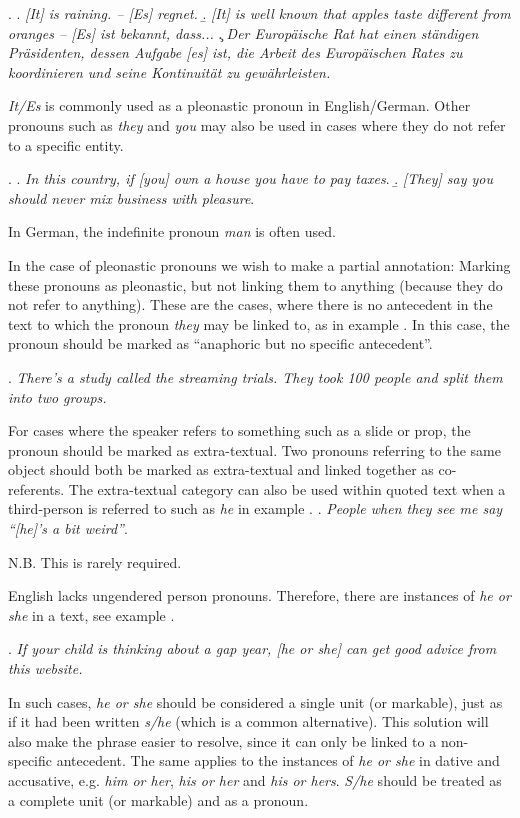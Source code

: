 \documentclass[a4paper]{article}
\begin{document}
\ex.
\a. {\sl [It] is raining. -- [Es] regnet.}
\b. {\sl [It] is well known that apples taste different from oranges --  [Es] ist bekannt, dass...}
\c. {\sl Der Europäische Rat hat einen ständigen Präsidenten, dessen Aufgabe [es] ist, die Arbeit des Europäischen Rates zu koordinieren und seine Kontinuität zu gewährleisten.}

{\sl It/Es} is commonly used as a pleonastic pronoun in English/German. Other pronouns such as {\sl they} and {\sl you} may also be used in cases where they do not refer to a specific
entity.

\ex.
\a. {\sl In this country, if [you] own a house you have to pay taxes}.
\b. {\sl [They] say you should never mix business with pleasure}.

In German, the indefinite pronoun {\sl man} is often used. 

In the case of pleonastic pronouns we wish to make a partial annotation: Marking these pronouns as pleonastic, but not linking them to anything (because they do not refer to anything). These are the cases, where there is no antecedent in the text to which the pronoun {\sl they} may be linked to, as in example \Next. In this case, the pronoun should be marked as ``anaphoric but no specific antecedent''.

\ex. {\sl There's a study called the streaming trials. {\sl They} took 100 people and split them into two groups.}

For cases where the speaker refers to something such as a slide or prop, the pronoun should be marked as extra-textual. Two pronouns referring to the same object should both be marked as extra-textual and linked together as co-referents.
The extra-textual category can also be used within quoted text when a third-person is referred to such as {\sl he} in example \Next.
\ex.
{\sl People when they see me say ``[he]'s a bit weird''}.

N.B. This is rarely required.


English lacks ungendered person pronouns. Therefore, there are instances of {\sl he or she} in a text, see example \Next.

\ex.
{\sl If your child is thinking about a gap year, [he or she] can get good advice from this website.}

In such cases, {\sl he or she} should be considered a single unit (or markable), just as if it had been written {\sl s/he} (which is a common alternative). This solution will also make the phrase easier to resolve, since it can only be linked to a
non-specific antecedent. The same applies to the instances of {\sl he or she} in dative and accusative, e.g. {\sl him or her}, {\sl his or her} and {\sl his or hers}. {\sl S/he}
should be treated as a complete unit (or markable) and as a pronoun.
\end{document}

